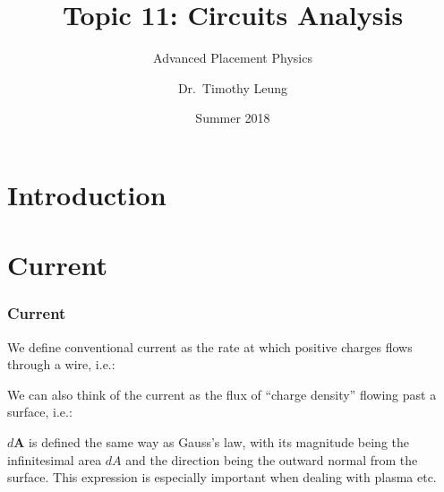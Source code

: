 \documentclass[12pt,aspectratio=169]{beamer}
\title{Topic 11: Circuits Analysis}
\subtitle{Advanced Placement Physics}
\author[TML]{Dr.\ Timothy Leung}
\institute{Olympiads School}
\date{Summer 2018}
\newcommand{\mb}[1]{\mathbf{#1}}
\newcommand{\eq}[2]{\vspace{#1}{\Large\begin{displaymath}#2\end{displaymath}}}
\begin{document}
\begin{frame}
  \maketitle
\end{frame}


\section[Intro]{Introduction}

%
%
%


\section{Current}

\begin{frame}
  \frametitle{Current}
  We define conventional current as the rate at which positive charges flows
  through a wire, i.e.:

  \eq{-.3in}{\boxed{I=\frac{dQ}{dt}}}

  We can also think of the current as the flux of ``charge density'' flowing
  past a surface, i.e.:
  
  \eq{-.3in}{\boxed{I=\int\mb{J}\cdot d\mb{A}}}

  $d\mb{A}$ is defined the same way as Gauss's law, with its
  magnitude being the infinitesimal area $dA$ and the direction being the
  outward normal from the surface. This expression is especially important when
  dealing with plasma etc.
\end{frame}
\end{document}
